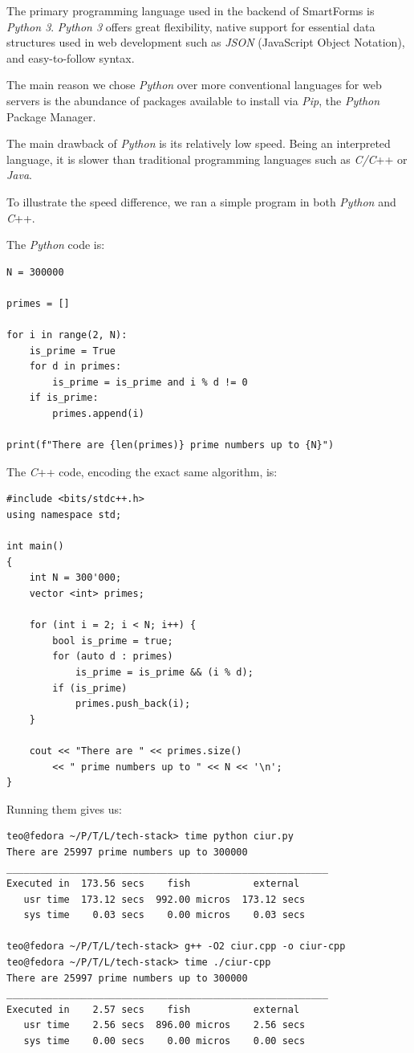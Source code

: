 \documentclass[11pt, a4paper]{report}
\begin{document}
The primary programming language used in the backend of SmartForms is \textit{Python 3}.
\textit{Python 3} offers great flexibility, native support for essential data structures used in web development such as \textit{JSON} (JavaScript Object Notation), and easy-to-follow syntax.

The main reason we chose \textit{Python} over more conventional languages for web servers is the abundance of packages available to install via \textit{Pip}, the \textit{Python} Package Manager.

The main drawback of \textit{Python} is its relatively low speed. Being an interpreted language, it is slower than traditional programming languages such as \textit{C/C}++ or \textit{Java}.

To illustrate the speed difference, we ran a simple program in both \textit{Python} and \textit{C}++.

The \textit{Python} code is:

\begin{verbatim}
N = 300000

primes = []

for i in range(2, N):
    is_prime = True
    for d in primes:
        is_prime = is_prime and i % d != 0
    if is_prime:
        primes.append(i)

print(f"There are {len(primes)} prime numbers up to {N}")
\end{verbatim}

The \textit{C}++ code, encoding the exact same algorithm, is:
\begin{verbatim}
#include <bits/stdc++.h>
using namespace std;

int main()
{
    int N = 300'000;
    vector <int> primes;

    for (int i = 2; i < N; i++) {
        bool is_prime = true;
        for (auto d : primes)
            is_prime = is_prime && (i % d);
        if (is_prime)
            primes.push_back(i);
    }

    cout << "There are " << primes.size()
        << " prime numbers up to " << N << '\n';
}
\end{verbatim}

Running them gives us:
\begin{verbatim}
teo@fedora ~/P/T/L/tech-stack> time python ciur.py
There are 25997 prime numbers up to 300000
________________________________________________________
Executed in  173.56 secs    fish           external
   usr time  173.12 secs  992.00 micros  173.12 secs
   sys time    0.03 secs    0.00 micros    0.03 secs

teo@fedora ~/P/T/L/tech-stack> g++ -O2 ciur.cpp -o ciur-cpp
teo@fedora ~/P/T/L/tech-stack> time ./ciur-cpp
There are 25997 prime numbers up to 300000
________________________________________________________
Executed in    2.57 secs    fish           external
   usr time    2.56 secs  896.00 micros    2.56 secs
   sys time    0.00 secs    0.00 micros    0.00 secs
\end{verbatim}
\end{document}
